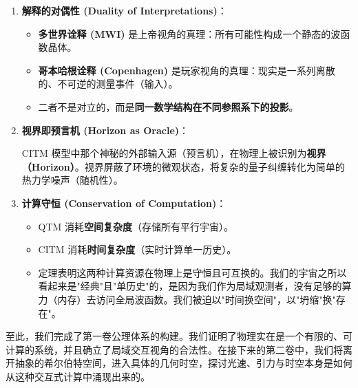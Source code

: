 \begin{enumerate}
\item \textbf{解释的对偶性 (Duality of Interpretations)}：

\begin{itemize}
\item \textbf{多世界诠释 (MWI)} 是上帝视角的真理：所有可能性构成一个静态的波函数晶体。

\item \textbf{哥本哈根诠释 (Copenhagen)} 是玩家视角的真理：现实是一系列离散的、不可逆的测量事件（输入）。

\item 二者不是对立的，而是\textbf{同一数学结构在不同参照系下的投影}。
\end{itemize}

\item \textbf{视界即预言机 (Horizon as Oracle)}：

CITM 模型中那个神秘的外部输入源（预言机），在物理上被识别为\textbf{视界（Horizon）}。视界屏蔽了环境的微观状态，将复杂的量子纠缠转化为简单的热力学噪声（随机性）。

\item \textbf{计算守恒 (Conservation of Computation)}：

\begin{itemize}
\item QTM 消耗\textbf{空间复杂度}（存储所有平行宇宙）。

\item CITM 消耗\textbf{时间复杂度}（实时计算单一历史）。

\item 定理表明这两种计算资源在物理上是守恒且可互换的。我们的宇宙之所以看起来是"经典"且"单历史"的，是因为我们作为局域观测者，没有足够的算力（内存）去访问全局波函数。我们被迫以"时间换空间"，以"坍缩"换"存在"。
\end{itemize}
\end{enumerate}

至此，我们完成了第一卷公理体系的构建。我们证明了物理实在是一个有限的、可计算的系统，并且确立了局域交互视角的合法性。在接下来的第二卷中，我们将离开抽象的希尔伯特空间，进入具体的几何时空，探讨光速、引力与时空本身是如何从这种交互式计算中涌现出来的。

